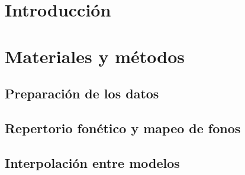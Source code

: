 \documentclass[11pt,a4paper,twoside]{tesis}
\begin{document}

\def\autor{Franco Negri}
\def\tituloTesis{Implementación y evaluación de un sistema de síntesis de habla con acento extranjero variable}
\def\runtitle{Implementacíón y evaluación de un sistema de sintesis de habla}
\def\director{Agustín Gravano}
\def\lugar{Buenos Aires, 2018}


\frontmatter

\pagestyle{empty}
%
\cleardoublepage
\cleardoublepage

\cleardoublepage
\tableofcontents

\mainmatter
\pagestyle{headings}

%
\chapter{Introducción}

\chapter{Materiales y métodos}

\section{Preparación de los datos}\label{dataPrepartion}


\section{Repertorio fonético y mapeo de fonos}\label{phoneMaping}


\section{Interpolación entre modelos}\label{modelInterpolation}

\end{document}
